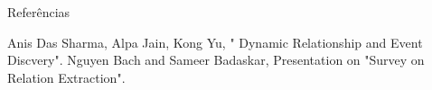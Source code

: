 \documentclass[10pt]{beamer}
\begin{document}
\begin{frame}{Referências}
  \begin{thebibliography}{99}
Anis Das Sharma, Alpa Jain, Kong Yu, " Dynamic Relationship and Event Discvery".
Nguyen Bach and Sameer Badaskar, Presentation on "Survey on Relation Extraction".
\end{thebibliography}
\end{frame}

\begin{frame}
\Large
\begin{center}
\end{center}
\end{frame}
\end{document}
